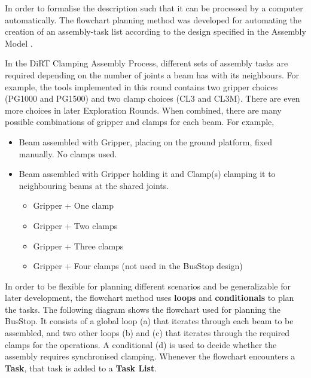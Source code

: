 


In order to formalise the description such that it can be processed by a computer automatically. The flowchart planning method was developed for automating the creation of an assembly-task list according to the design specified in the Assembly Model \parencite{huangNewAnalogProtocol2021}.

In the DiRT Clamping Assembly Process, different sets of assembly tasks are required depending on the number of joints a beam has with its neighbours. For example, the tools implemented in this round contains two gripper choices (PG1000 and PG1500) and two clamp choices (CL3 and CL3M). There are even more choices in later Exploration Rounds. When combined, there are many possible combinations of gripper and clamps for each beam. For example,

\begin{itemize}
	\item Beam assembled with Gripper, placing on the ground platform, fixed manually. No clamps used.

	\item Beam assembled with Gripper holding it and Clamp(s) clamping it to neighbouring beams at the shared joints.

	\begin{itemize}
		\item Gripper + One clamp

		\item Gripper + Two clamps

		\item Gripper + Three clamps

		\item Gripper + Four clamps (not used in the BusStop design)

	\end{itemize}
\end{itemize}
In order to be flexible for planning different scenarios and be generalizable for later development, the flowchart method uses \textbf{loops }and \textbf{conditionals }to plan the tasks. The following diagram shows the flowchart used for planning the BusStop. It consists of a global loop (a) that iterates through each beam to be assembled, and two other loops (b) and (c) that iterates through the required clamps for the operations. A conditional (d) is used to decide whether the assembly requires synchronised clamping. Whenever the flowchart encounters a \textbf{Task}, that task is added to a \textbf{Task List}. 

